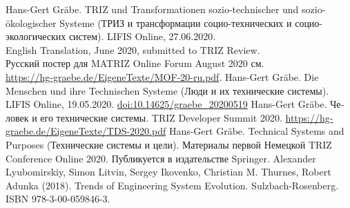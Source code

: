 \documentclass[11pt,a4paper]{article}
\begin{document}
\begin{thebibliography}{xxx}
 Hans-Gert Gräbe.  TRIZ und Transformationen
  sozio-technischer und sozio-ökologischer Systeme (ТРИЗ и трансформации
  социо-технических и социо-экологических систем). LIFIS Online,
  27.06.2020.\\ English Translation, June 2020, submitted to TRIZ
  Review.\\ Русский постер для MATRIZ Online Forum August 2020 см.
  \\ \url{https://hg-graebe.de/EigeneTexte/MOF-20-ru.pdf}.
 Hans-Gert Gräbe. Die Menschen und ihre Technischen
  Systeme (Люди и их технические системы). LIFIS Online, 19.05.2020.
  \url{doi:10.14625/graebe_20200519}
 Hans-Gert Gräbe.  \foreignlanguage{russian}{Человек и
  его технические системы}.  TRIZ Developer Summit 2020.
  \url{https://hg-graebe.de/EigeneTexte/TDS-2020.pdf}
 Hans-Gert Gräbe.  Technical Systems and Purposes
  (Технические системы и цели). Материалы первой Немецкой TRIZ Conference
  Online 2020. Публикуется в издательстве Springer.
 Alexander Lyubomirskiy, Simon Litvin, Sergey Ikovenko,
  Christian M. Thurnes, Robert Adunka (2018). Trends of Engineering System
  Evolution. Sulzbach-Rosenberg.  ISBN 978-3-00-059846-3.
\end{thebibliography}
\end{document}
